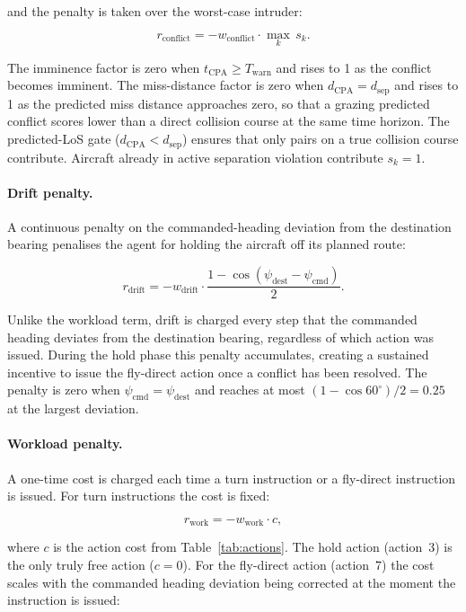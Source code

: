 \documentclass[11pt, a4paper]{article}
\begin{document}
and the penalty is taken over the worst-case intruder:

\begin{equation}
    r_\text{conflict} = -w_\text{conflict} \cdot \max_k\, s_k.
\end{equation}

The imminence factor is zero when $t_\text{CPA} \geq T_\text{warn}$ and rises
to 1 as the conflict becomes imminent.
The miss-distance factor is zero when $d_\text{CPA} = d_\text{sep}$ and rises
to 1 as the predicted miss distance approaches zero, so that a grazing
predicted conflict scores lower than a direct collision course at the same
time horizon.
The predicted-LoS gate ($d_\text{CPA} < d_\text{sep}$) ensures that only
pairs on a true collision course contribute.
Aircraft already in active separation violation contribute $s_k = 1$.

\paragraph{Drift penalty.}
A continuous penalty on the commanded-heading deviation from the destination
bearing penalises the agent for holding the aircraft off its planned route:

\begin{equation}
    r_\text{drift}
    = -w_\text{drift} \cdot \frac{1 - \cos(\psi_\text{dest} - \psi_\text{cmd})}{2}.
\end{equation}

Unlike the workload term, drift is charged every step that the commanded
heading deviates from the destination bearing, regardless of which action
was issued.
During the hold phase this penalty accumulates, creating a sustained
incentive to issue the fly-direct action once a conflict has been resolved.
The penalty is zero when $\psi_\text{cmd} = \psi_\text{dest}$ and reaches
at most $(1 - \cos 60^\circ)/2 = 0.25$ at the largest deviation.

\paragraph{Workload penalty.}
A one-time cost is charged each time a turn instruction or a fly-direct
instruction is issued.
For turn instructions the cost is fixed:

\begin{equation}
    r_\text{work} = -w_\text{work} \cdot c,
\end{equation}

where $c$ is the action cost from Table~\ref{tab:actions}.
The hold action (action~3) is the only truly free action ($c = 0$).
For the fly-direct action (action~7) the cost scales with the commanded
heading deviation being corrected at the moment the instruction is issued:
\end{document}

